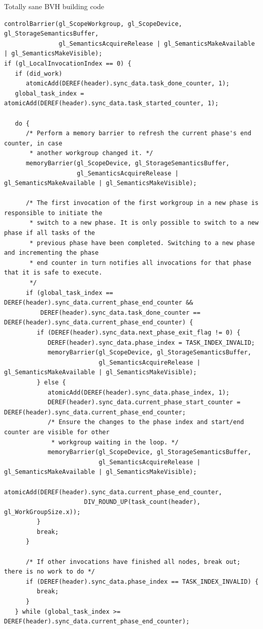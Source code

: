 \documentclass[aspectratio=169,t]{beamer}
\begin{document}
\begin{frame}[fragile]{Totally sane BVH building code}
\small
  \begin{lstlisting}[columns=fullflexible]
controlBarrier(gl_ScopeWorkgroup, gl_ScopeDevice, gl_StorageSemanticsBuffer,
               gl_SemanticsAcquireRelease | gl_SemanticsMakeAvailable | gl_SemanticsMakeVisible);
if (gl_LocalInvocationIndex == 0) {
   if (did_work)
      atomicAdd(DEREF(header).sync_data.task_done_counter, 1);
   global_task_index = atomicAdd(DEREF(header).sync_data.task_started_counter, 1);

   do {
      /* Perform a memory barrier to refresh the current phase's end counter, in case
       * another workgroup changed it. */
      memoryBarrier(gl_ScopeDevice, gl_StorageSemanticsBuffer,
                    gl_SemanticsAcquireRelease | gl_SemanticsMakeAvailable | gl_SemanticsMakeVisible);

      /* The first invocation of the first workgroup in a new phase is responsible to initiate the
       * switch to a new phase. It is only possible to switch to a new phase if all tasks of the
       * previous phase have been completed. Switching to a new phase and incrementing the phase
       * end counter in turn notifies all invocations for that phase that it is safe to execute.
       */
      if (global_task_index == DEREF(header).sync_data.current_phase_end_counter &&
          DEREF(header).sync_data.task_done_counter == DEREF(header).sync_data.current_phase_end_counter) {
         if (DEREF(header).sync_data.next_phase_exit_flag != 0) {
            DEREF(header).sync_data.phase_index = TASK_INDEX_INVALID;
            memoryBarrier(gl_ScopeDevice, gl_StorageSemanticsBuffer,
                          gl_SemanticsAcquireRelease | gl_SemanticsMakeAvailable | gl_SemanticsMakeVisible);
         } else {
            atomicAdd(DEREF(header).sync_data.phase_index, 1);
            DEREF(header).sync_data.current_phase_start_counter = DEREF(header).sync_data.current_phase_end_counter;
            /* Ensure the changes to the phase index and start/end counter are visible for other
             * workgroup waiting in the loop. */
            memoryBarrier(gl_ScopeDevice, gl_StorageSemanticsBuffer,
                          gl_SemanticsAcquireRelease | gl_SemanticsMakeAvailable | gl_SemanticsMakeVisible);
            atomicAdd(DEREF(header).sync_data.current_phase_end_counter,
                      DIV_ROUND_UP(task_count(header), gl_WorkGroupSize.x));
         }
         break;
      }

      /* If other invocations have finished all nodes, break out; there is no work to do */
      if (DEREF(header).sync_data.phase_index == TASK_INDEX_INVALID) {
         break;
      }
   } while (global_task_index >= DEREF(header).sync_data.current_phase_end_counter);


\end{lstlisting}
\end{frame}
\end{document}
